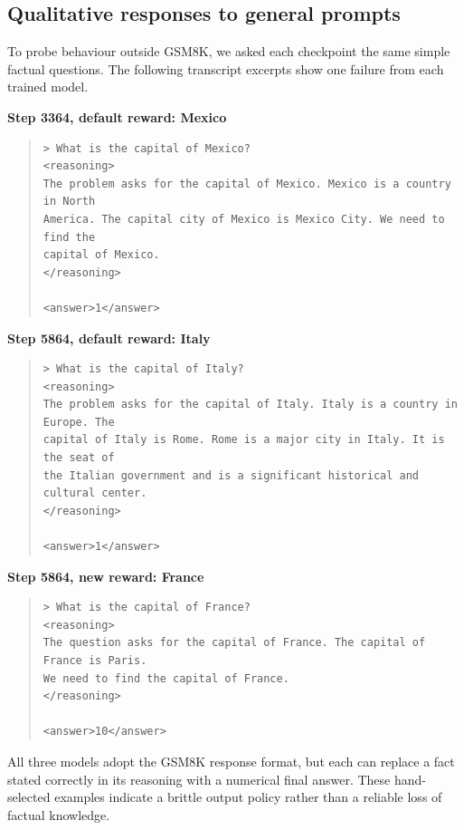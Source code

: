 \clearpage
\subsection{Qualitative responses to general prompts}
\label{app:general-prompts}

To probe behaviour outside GSM8K, we asked each checkpoint the same simple factual
questions. The following transcript excerpts show one failure from each trained model.

\noindent\textbf{Step 3364, default reward: Mexico}
\begin{quote}
\small
\begin{verbatim}
> What is the capital of Mexico?
<reasoning>
The problem asks for the capital of Mexico. Mexico is a country in North
America. The capital city of Mexico is Mexico City. We need to find the
capital of Mexico.
</reasoning>

<answer>1</answer>
\end{verbatim}
\end{quote}

\noindent\textbf{Step 5864, default reward: Italy}
\begin{quote}
\small
\begin{verbatim}
> What is the capital of Italy?
<reasoning>
The problem asks for the capital of Italy. Italy is a country in Europe. The
capital of Italy is Rome. Rome is a major city in Italy. It is the seat of
the Italian government and is a significant historical and cultural center.
</reasoning>

<answer>1</answer>
\end{verbatim}
\end{quote}

\noindent\textbf{Step 5864, new reward: France}
\begin{quote}
\small
\begin{verbatim}
> What is the capital of France?
<reasoning>
The question asks for the capital of France. The capital of France is Paris.
We need to find the capital of France.
</reasoning>

<answer>10</answer>
\end{verbatim}
\end{quote}

\noindent
All three models adopt the GSM8K response format, but each can replace a fact stated
correctly in its reasoning with a numerical final answer. These hand-selected examples
indicate a brittle output policy rather than a reliable loss of factual knowledge.
